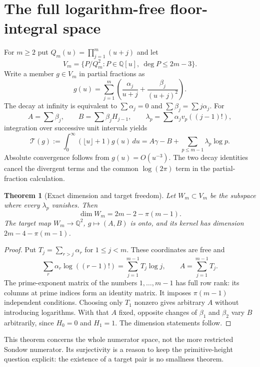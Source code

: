 \documentclass[11pt,a4paper]{article}
\newcommand{\Q}{\mathbb Q}
\newtheorem{theorem}{Theorem}[section]
\theoremstyle{definition}
\theoremstyle{remark}
\numberwithin{equation}{section}
\begin{document}
\section{The full logarithm-free floor-integral space}
\label{ec:floor}

For $m\ge2$ put $Q_m(u)=\prod_{j=1}^m(u+j)$ and let
\[
 V_m=\{P/Q_m^2:P\in\Q[u],\ \deg P\le2m-3\}.
\]
Write a member $g\in V_m$ in partial fractions as
\[
 g(u)=\sum_{j=1}^m\left(\frac{\alpha_j}{u+j}
                         +\frac{\beta_j}{(u+j)^2}\right).
\]
The decay at infinity is equivalent to
$\sum\alpha_j=0$ and $\sum\beta_j=\sum j\alpha_j$.  For
\[
 A=\sum\beta_j,\qquad B=\sum\beta_jH_{j-1},\qquad
 \lambda_p=\sum\alpha_jv_p((j-1)!),
\]
integration over successive unit intervals yields
\[
 \mathcal T(g):=\int_0^\infty(\lfloor u\rfloor+1)g(u)\,du
 =A\gamma-B+\sum_{p\le m-1}\lambda_p\log p.
\]
Absolute convergence follows from $g(u)=O(u^{-3})$.  The two decay
identities cancel the divergent terms and the common $\log(2\pi)$ term
in the partial-fraction calculation.

\begin{theorem}[Exact dimension and target freedom]
\label{ec:floor-dimension}
Let $W_m\subset V_m$ be the subspace where every $\lambda_p$ vanishes.
Then
\[
 \dim W_m=2m-2-\pi(m-1).
\]
The target map $W_m\to\Q^2$, $g\mapsto(A,B)$ is onto, and its kernel
has dimension $2m-4-\pi(m-1)$.
\end{theorem}
\begin{proof}
Put $T_j=\sum_{r>j}\alpha_r$ for $1\le j<m$.  These coordinates are
free and
\[
 \sum_r\alpha_r\log((r-1)!)=\sum_{j=1}^{m-1}T_j\log j,
 \qquad A=\sum_{j=1}^{m-1}T_j.
\]
The prime-exponent matrix of the numbers $1,\ldots,m-1$ has full row
rank: its columns at prime indices form an identity matrix.  It imposes
$\pi(m-1)$ independent conditions.  Choosing only $T_1$ nonzero gives
arbitrary $A$ without introducing logarithms.  With that $A$ fixed,
opposite changes of $\beta_1$ and $\beta_2$ vary $B$ arbitrarily, since
$H_0=0$ and $H_1=1$.  The dimension statements follow.
\end{proof}

This theorem concerns the whole numerator space, not the more restricted
Sondow numerator.  Its surjectivity is a reason to keep the primitive-height
question explicit: the existence of a target pair is no smallness theorem.
\end{document}
